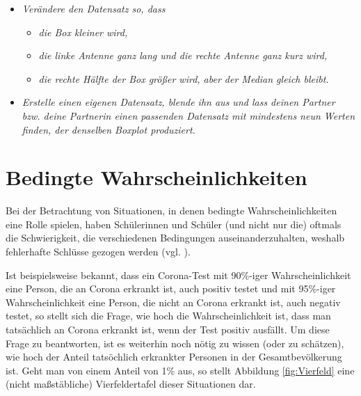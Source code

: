 \documentclass[
]{scrbook}
\providecommand{\tightlist}{%
  \setlength{\itemsep}{0pt}\setlength{\parskip}{0pt}}
\theoremstyle{definition}
\theoremstyle{definition}
\theoremstyle{definition}
\theoremstyle{definition}
\theoremstyle{remark}
\begin{document}
\begin{itemize}
\tightlist
\item
  \emph{Verändere den Datensatz so, dass}

  \begin{itemize}
  \tightlist
  \item
    \emph{die Box kleiner wird,}
  \item
    \emph{die linke Antenne ganz lang und die rechte Antenne ganz kurz wird,}
  \item
    \emph{die rechte Hälfte der Box größer wird, aber der Median gleich bleibt.}
  \end{itemize}
\item
  \emph{Erstelle einen eigenen Datensatz, blende ihn aus und lass deinen Partner bzw. deine Partnerin einen passenden Datensatz mit mindestens neun Werten finden, der denselben Boxplot produziert.}
\end{itemize}

\section{Bedingte Wahrscheinlichkeiten}\label{bedingte-wahrscheinlichkeiten}

Bei der Betrachtung von Situationen, in denen bedingte Wahrscheinlichkeiten eine Rolle spielen, haben Schülerinnen und Schüler (und nicht nur die) oftmals die Schwierigkeit, die verschiedenen Bedingungen auseinanderzuhalten, weshalb fehlerhafte Schlüsse gezogen werden (vgl. ).

Ist beispielsweise bekannt, dass ein Corona-Test mit 90\%-iger Wahrscheinlichkeit eine Person, die an Corona erkrankt ist, auch positiv testet und mit 95\%-iger Wahrscheinlichkeit eine Person, die nicht an Corona erkrankt ist, auch negativ testet, so stellt sich die Frage, wie hoch die Wahrscheinlichkeit ist, dass man tatsächlich an Corona erkrankt ist, wenn der Test positiv ausfällt. Um diese Frage zu beantworten, ist es weiterhin noch nötig zu wissen (oder zu schätzen), wie hoch der Anteil tatsöchlich erkrankter Personen in der Gesamtbevölkerung ist. Geht man von einem Anteil von 1\% aus, so stellt Abbildung \ref{fig:Vierfeld} eine (nicht maßstäbliche) Vierfeldertafel dieser Situationen dar.
\end{document}
